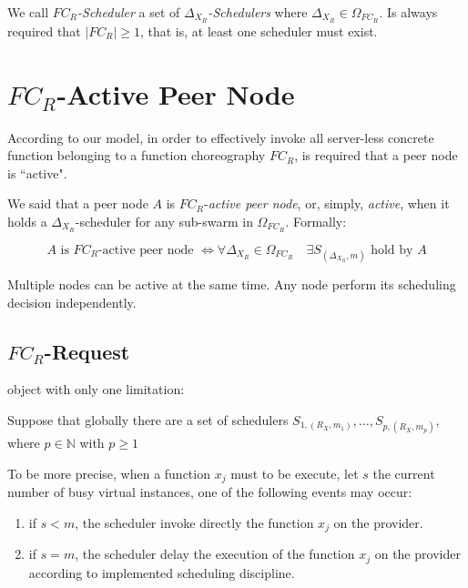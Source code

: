 \documentclass[10pt,a4paper]{article}
\begin{document}
We call \textit{$FC_R$-Scheduler} a set of \textit{$\Delta_{X_{R}}$-Schedulers} where $\Delta_{X_{R}} \in \Omega_{FC_R}$. Is always required that $|FC_R| \geq 1$, that is, at least one scheduler must exist.

\section{$FC_R$-Active Peer Node}

According to our model, in order to effectively invoke all server-less concrete function belonging to a function choreography $FC_R$, is required that a peer node is ``active".

We said that a peer node $A$ is $FC_R$-\textit{active peer node}, or, simply, \textit{active}, when it holds a $\Delta_{X_{R}}$-scheduler for any sub-swarm in $\Omega_{FC_R}$. Formally:

\begin{equation}
A \text{ is } FC_R\text{-active peer node } \Leftrightarrow \forall \Delta_{X_{R}} \in \Omega_{FC_R} \quad \exists S_{(\Delta_{X_{R}},m)} \text{ hold by } A
\end{equation}

Multiple nodes can be active at the same time. Any node perform its scheduling decision independently.

\subsection{$FC_R$-Request}







 object with only one limitation:

Suppose that globally there are a set of schedulers $S_{1,({R_{X}},m_1)}, \ldots , S_{p,({R_{X}},m_p)}$, where $p \in \mathbb{N}$ with $p \geq 1$



To be more precise, when a function $x_j$ must to be execute, let $s$ the current number of busy virtual instances, one of the following events may occur:
\begin{enumerate}
\item if $s < m$, the scheduler invoke directly the function $x_j$ on the provider.
\item if $s = m$, the scheduler delay the execution of the function $x_j$ on the provider according to implemented scheduling discipline.
\end{enumerate}
\end{document}
